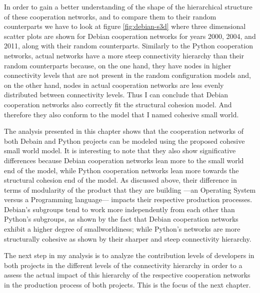 In order to gain a better understanding of the shape of the hierarchical structure of these cooperation networks, and to compare them to their random counterparts we have to look at figure \ref{fig:debian-s3d} where three dimensional scatter plots are shown for Debian cooperation networks for years 2000, 2004, and 2011, along with their random counterparts. Similarly to the Python cooperation networks, actual networks have a more steep connectivity hierarchy than their random counterparts because, on the one hand, they have nodes in higher connectivity levels that are not present in the random configuration models and, on the other hand, nodes in actual cooperation networks are less evenly distributed between connectivity levels. Thus I can conclude that Debian cooperation networks also correctly fit the structural cohesion model. And therefore they also conform to the model that I named cohesive small world.

The analysis presented in this chapter shows that the cooperation networks of both Debain and Python projects can be modeled using the proposed cohesive small world model. It is interesting to note that they also show significative differences because Debian cooperation networks lean more to the small world end of the model, while Python cooperation networks lean more towards the structural cohesion end of the model. As discussed above, their difference in terms of modularity of the product that they are building ---an Operating System versus a Programming language--- impacts their respective production processes. Debian's subgroups tend to work more independently from each other than Python's subgroups, as shown by the fact that Debian cooperation networks exhibit a higher degree of smallworldiness; while Python's networks are more structurally cohesive as shown by their sharper and steep connectivity hierarchy.

The next step in my analysis is to analyze the contribution levels of developers in both projects in the different levels of the connectivity hierarchy in order to a assess the actual impact of this hierarchy of the respective cooperation networks in the production process of both projects. This is the focus of the next chapter.



